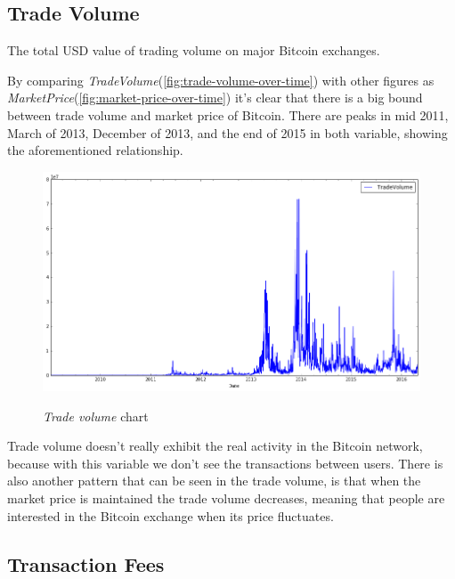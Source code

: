 
\subsection{Trade Volume}
\label{sec:trade-volume}

The total USD value of trading volume on major Bitcoin exchanges.

By comparing
\textit{TradeVolume}(\autoref{fig:trade-volume-over-time}) with other
figures as \textit{MarketPrice}(\autoref{fig:market-price-over-time})
it's clear that there is a big bound between trade volume and market
price of Bitcoin. There are peaks in mid 2011, March of 2013, December
of 2013, and the end of 2015 in both variable, showing the
aforementioned relationship.

\begin{figure}[bth]
  \myfloatalign
  {\includegraphics[width=1\linewidth]
    {gfx/trade-volume-over-time}}
  \caption{\textit{Trade volume}
    chart}
  \label{fig:trade-volume-over-time}
\end{figure}

Trade volume doesn't really exhibit the real activity in the Bitcoin
network, because with this variable we don't see the transactions
between users. There is also another pattern that can be seen in the
trade volume, is that when the market price is maintained the trade
volume decreases, meaning that people are interested in the Bitcoin
exchange when its price fluctuates.


\subsection{Transaction Fees}
\label{sec:transaction-fees}



